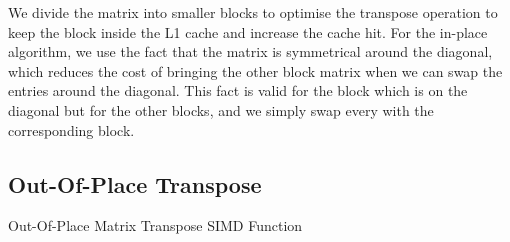 We divide the matrix into smaller blocks to optimise the transpose 
operation to keep the block inside the L1 cache and increase the 
cache hit. For the in-place algorithm, we use the fact that the 
matrix is symmetrical around the diagonal, which reduces the cost 
of bringing the other block matrix when we can swap the entries 
around the diagonal. This fact is valid for the block which is 
on the diagonal but for the other blocks, and we simply swap 
every with the corresponding block.

\subsection{Out-Of-Place Transpose}

\begin{algorithm}[H]
    \SetAlgoLined

    \caption{Out-Of-Place Matrix Transpose SIMD Function}
\end{algorithm}


